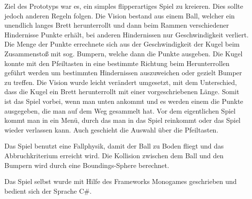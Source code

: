 \documentclass[10pt]{article}
\begin{document}
Ziel des Prototyps war es, ein simples flipperartiges Spiel zu kreieren. Dies sollte jedoch anderen Regeln folgen. Die Vision
bestand aus einem Ball, welcher ein unendlich langes Brett herunterrollt und dann beim Rammen verschiedener Hindernisse
Punkte erhält, bei anderen Hindernissen nur Geschwindigkeit verliert. Die Menge der Punkte errechnete sich aus der Geschwindigkeit
der Kugel beim Zusammenstoß mit sog. Bumpern, welche dann die Punkte ausgeben. Die Kugel konnte mit den Pfeiltasten
in eine bestimmte Richtung beim Herunterrollen geführt werden um bestimmten Hindernissen auszuweichen oder gezielt Bumper
zu treffen. Die Vision wurde leicht verändert umgesetzt, mit dem Unterschied, dass die Kugel ein Brett herunterrollt mit einer
vorgeschriebenen Länge. Somit ist das Spiel vorbei, wenn man unten ankommt und es werden einem die Punkte ausgegeben,
die man auf dem Weg gesammelt hat. Vor dem eigentlichen Spiel kommt man in ein Menü, durch das man in das Spiel
reinkommt oder das Spiel wieder verlassen kann. Auch geschieht die Auswahl über die Pfeiltasten.\newline

\noindent Das Spiel benutzt eine Fallphysik, damit der Ball zu Boden fliegt und das Abbruchkriterium erreicht wird. Die Kollision
zwischen dem Ball und den Bumpern wird durch eine Boundings-Sphere berechnet.

\noindent Das Spiel selbst wurde mit Hilfe des Frameworks Monogames geschrieben und bedient sich der Sprache C\#.

\vspace{0.5cm}
\end{document}
